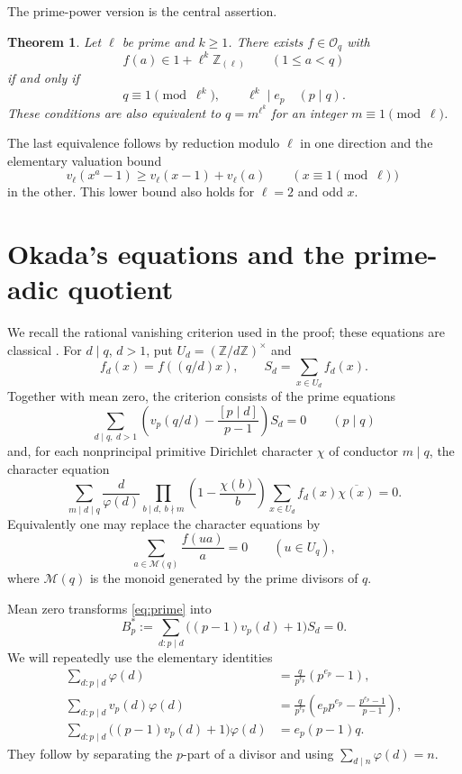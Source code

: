 \documentclass[11pt]{article}
\newtheorem{theorem}{Theorem}
\newcommand{\Z}{\mathbb Z}
\newcommand{\Rl}{\mathbb Z_{(\ell)}}
\newcommand{\OO}{\mathcal O}
\begin{document}
The prime-power version is the central assertion.
\begin{theorem}\label{thm:local}
Let $\ell$ be prime and $k\ge1$. There exists $f\in\OO_q$ with
\[
 f(a)\in1+\ell^k\Rl\qquad(1\le a<q)
\]
if and only if
\begin{equation}\label{eq:localconditions}
 q\equiv1\pmod{\ell^k},\qquad \ell^k\mid e_p\quad(p\mid q).
\end{equation}
These conditions are also equivalent to $q=m^{\ell^k}$ for an integer $m\equiv1\pmod\ell$.
\end{theorem}

The last equivalence follows by reduction modulo $\ell$ in one direction and the elementary valuation bound
\[
 v_\ell(x^a-1)\ge v_\ell(x-1)+v_\ell(a)\qquad(x\equiv1\pmod\ell)
\]
in the other. This lower bound also holds for $\ell=2$ and odd $x$.

\section{Okada's equations and the prime-adic quotient}
We recall the rational vanishing criterion used in the proof; these equations are classical \cite{Okada,MP,Bharadwaj}. For $d\mid q$, $d>1$, put $U_d=(\Z/d\Z)^\times$ and
\[
 f_d(x)=f((q/d)x),\qquad S_d=\sum_{x\in U_d}f_d(x).
\]
Together with mean zero, the criterion consists of the prime equations
\begin{equation}\label{eq:prime}
 \sum_{d\mid q,\ d>1}\left(v_p(q/d)-\frac{[p\mid d]}{p-1}\right)S_d=0
 \qquad(p\mid q)
\end{equation}
and, for each nonprincipal primitive Dirichlet character $\chi$ of conductor $m\mid q$, the character equation
\begin{equation}\label{eq:character}
 \sum_{m\mid d\mid q}\frac d{\varphi(d)}
 \prod_{b\mid d,\ b\nmid m}\left(1-\frac{\chi(b)}b\right)
 \sum_{x\in U_d}f_d(x)\overline{\chi(x)}=0.
\end{equation}
Equivalently one may replace the character equations by
\begin{equation}\label{eq:unit}
 \sum_{a\in\mathcal M(q)}\frac{f(ua)}a=0\qquad(u\in U_q),
\end{equation}
where $\mathcal M(q)$ is the monoid generated by the prime divisors of $q$.

Mean zero transforms \eqref{eq:prime} into
\begin{equation}\label{eq:Bstar}
 B_p^*:=\sum_{d:p\mid d}\bigl((p-1)v_p(d)+1\bigr)S_d=0.
\end{equation}
We will repeatedly use the elementary identities
\begin{align}
 \sum_{d:p\mid d}\varphi(d)&=\frac q{p^{e_p}}(p^{e_p}-1),\label{eq:divsum1}\\
 \sum_{d:p\mid d}v_p(d)\varphi(d)
 &=\frac q{p^{e_p}}\left(e_pp^{e_p}-\frac{p^{e_p}-1}{p-1}\right),\label{eq:divsum2}\\
 \sum_{d:p\mid d}\bigl((p-1)v_p(d)+1\bigr)\varphi(d)
 &=e_p(p-1)q.\label{eq:divsum3}
\end{align}
They follow by separating the $p$-part of a divisor and using $\sum_{d\mid n}\varphi(d)=n$.
\end{document}
